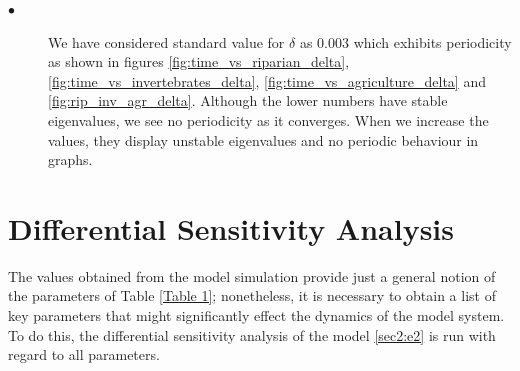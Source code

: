 \documentclass[12pt]{article}
\numberwithin{equation}{section}
\begin{document}
\begin{description}
\item[$\bullet$] We have considered standard value for $\delta$ as $0.003$ which exhibits periodicity as shown in figures \ref{fig:time_vs_riparian_delta}, \ref{fig:time_vs_invertebrates_delta}, \ref{fig:time_vs_agriculture_delta} and \ref{fig:rip_inv_agr_delta}. Although the lower numbers have stable eigenvalues, we see no periodicity as it converges. When we increase the values, they display unstable eigenvalues and no periodic behaviour in graphs.\\
\end{description}
\section{Differential Sensitivity Analysis}
The values obtained from the model simulation provide just a general notion of the parameters of Table \ref{Table 1}; nonetheless, it is necessary to obtain a list of key parameters that might significantly effect the dynamics of the model system. To do this, the differential sensitivity analysis of the model \eqref{sec2:e2} is run with regard to all parameters.
\end{document}
